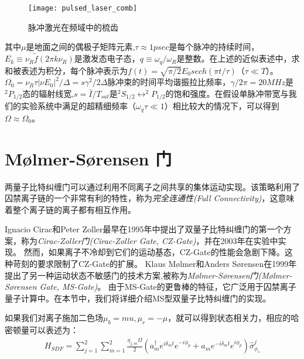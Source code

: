 \begin{figure}
    \centering
    \caption[脉冲激光在频域中的梳齿]{脉冲激光在频域中的梳齿\cite[Chap1.3]{Mizrahi_2013}\label{fig:pulsed_laser_comb}}
    \texttt{[image: pulsed\_laser\_comb]}
\end{figure}

其中$\mu$是地面之间的偶极子矩阵元素,$\tau\approx 1 psec$是每个脉冲的持续时间，$E_k\equiv \nu_R\tilde{f}(2\pi k\nu_R)$是激发态电子态，$q\equiv\omega_q/\omega_R$是整数。在上述的近似表述中，求和被表述为积分，每个脉冲表示为$f(t)=\sqrt{\pi/2}E_0 sech(\pi t/\tau)$（$\tau\ll T$）。$\Omega_0=\nu_R\tau|\nu E_0|^2/\Delta=s\gamma^2/2\Delta$脉冲束的时间平均谐振拉比频率，$\gamma/2\pi=20MHz$是$^2P_{1/2}$态的辐射线宽,$s=\bar{I}/T_{sat}$是$^2S_{1/2}\leftrightarrow ^2P_{1/2}$的饱和强度。在假设单脉冲带宽与我们的实验系统中满足的超精细频率（$\omega_q\tau\ll 1$）相比较大的情况下，可以得到$\Omega\approx\Omega_0$。

\section[Mølmer-Sørensen 门]{Mølmer-Sørensen 门}

两量子比特纠缠门可以通过利用不同离子之间共享的集体运动实现。该策略利用了囚禁离子链的一个非常有利的特性，称为\emph{完全连通性(Full Connectivity)}，这意味着整个离子链的离子都有相互作用。

Ignacio Cirac和Peter Zoller最早在1995年中提出了双量子比特纠缠门的第一个方案\cite[]{Cirac_Zoller_2002}，称为\emph{Cirac-Zoller门(Cirac-Zoller Gate, CZ-Gate)}，并在2003年在实验中实现\cite[]{Schmidt_Kaler_Häffner_Riebe_Gulde_Lancaster_Deuschle_Becher_Roos_Eschner_Blatt_2003}。
然而，如果离子不冷却到它们的运动基态，CZ-Gate的性能会急剧下降。这种苛刻的要求限制了CZ-Gate的扩展。
Klaus Mølmer和Anders Sørensen在1999年提出了另一种运动状态不敏感门的技术方案\cite[]{Sørensen_Mølmer_2002},被称为\emph{Mølmer-Sørensen门(Mølmer-Sørensen Gate, MS-Gate)}。
由于MS-Gate的更鲁棒的特征，它广泛用于囚禁离子量子计算中。在本节中，我们将详细介绍MS型双量子比特纠缠门的实现。

如果我们对离子施加二色场$\mu_b=mu, \mu_r=-\mu$，就可以得到状态相关力，相应的哈密顿量可以表述为：
\begin{align}
    H_{SDF}=\sum_{j=1}^{2}\sum_{m=1}^{2}\frac{\eta_{j,m}\Omega}{2}\left(a_m^\dagger e^{i\delta_m t}e^{-i\phi_p}+a_m e^{-i\delta_m t}e^{i\phi_p}\right)\hat{\sigma}_{\phi_s}^j
\end{align}


